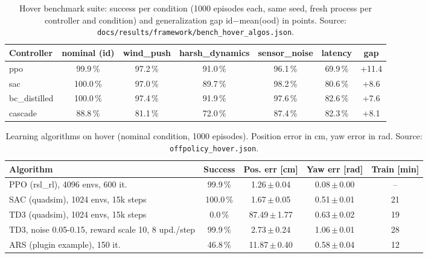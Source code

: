 \begin{table}[!htbp]\centering\small\caption{Hover benchmark suite: success per condition (1000 episodes each, same seed, fresh process per controller and condition) and generalization gap id$-$mean(ood) in points. Source: \texttt{docs/results/framework/bench\_hover\_algos.json}.}\label{tab:fw_algos}
\begin{adjustbox}{max width=\linewidth}\begin{tabular}{lcccccc}\toprule
Controller & nominal (id) & wind\_push & harsh\_dynamics & sensor\_noise & latency & gap\\\midrule
ppo & 99.9\,\% & 97.2\,\% & 91.0\,\% & 96.1\,\% & 69.9\,\% & +11.4\\
sac & 100.0\,\% & 97.0\,\% & 89.7\,\% & 98.2\,\% & 80.6\,\% & +8.6\\
bc\_distilled & 100.0\,\% & 97.4\,\% & 91.9\,\% & 97.6\,\% & 82.6\,\% & +7.6\\
cascade & 88.8\,\% & 81.1\,\% & 72.0\,\% & 87.4\,\% & 82.3\,\% & +8.1\\
\bottomrule\end{tabular}\end{adjustbox}
\end{table}

\begin{table}[!htbp]\centering\small\caption{Learning algorithms on hover (nominal condition, 1000 episodes). Position error in cm, yaw error in rad. Source: \texttt{offpolicy\_hover.json}.}\label{tab:fw_offpolicy}
\begin{adjustbox}{max width=\linewidth}\begin{tabular}{lcccc}\toprule
Algorithm & Success & Pos. err [cm] & Yaw err [rad] & Train [min]\\\midrule
PPO (rsl\_rl), 4096 envs, 600 it. & 99.9\,\% & 1.26\,$\pm$\,0.04 & 0.08\,$\pm$\,0.00 & --\\
SAC (quadsim), 1024 envs, 15k steps & 100.0\,\% & 1.67\,$\pm$\,0.05 & 0.51\,$\pm$\,0.01 & 21\\
TD3 (quadsim), 1024 envs, 15k steps & 0.0\,\% & 87.49\,$\pm$\,1.77 & 0.63\,$\pm$\,0.02 & 19\\
TD3, noise 0.05-0.15, reward scale 10, 8 upd./step & 99.9\,\% & 2.73\,$\pm$\,0.24 & 1.06\,$\pm$\,0.01 & 28\\
ARS (plugin example), 150 it. & 46.8\,\% & 11.87\,$\pm$\,0.40 & 0.58\,$\pm$\,0.04 & 12\\
\bottomrule\end{tabular}\end{adjustbox}
\end{table}

